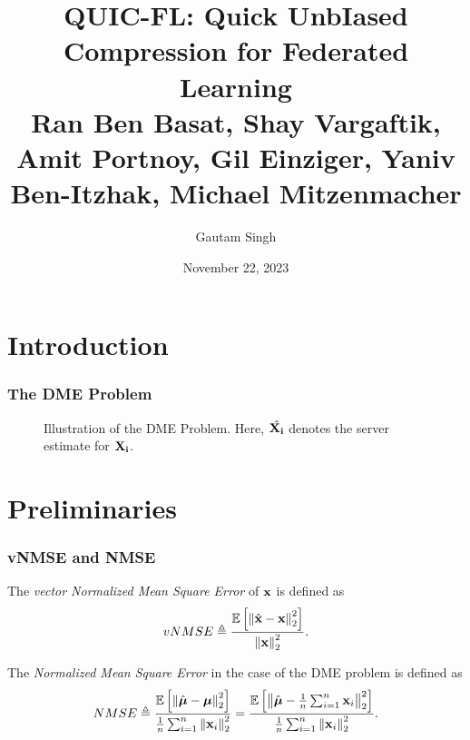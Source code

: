 \documentclass{beamer}
\title[QUIC-FL]{QUIC-FL: Quick UnbIased Compression for Federated Learning\\
\small Ran Ben Basat, Shay Vargaftik, Amit Portnoy, Gil Einziger, Yaniv Ben-Itzhak, Michael Mitzenmacher}
\date{November 22, 2023}
\author{Gautam Singh}
\institute[]{Indian Institute of Technology Hyderabad}
\begin{document}
    \maketitle
    \tableofcontents
    \section{Introduction}

    \begin{frame}
        \frametitle{The DME Problem}
        \begin{figure}[!ht]
            
            \caption{Illustration of the DME Problem. Here, \(\hat{\boldsymbol{\mathbf{X_i}}}\)
            denotes the server estimate for \(\boldsymbol{\mathbf{X_i}}\).} 
            \label{fig:dme}
        \end{figure}
    \end{frame}

    \section{Preliminaries}
    \begin{frame}
        \frametitle{vNMSE and NMSE}
        \begin{definition}[vNMSE]
        The \emph{vector Normalized Mean Square Error} of \(\boldsymbol{\mathbf{x}}\)
        is defined as
        \begin{equation}
            vNMSE \triangleq \frac{\mathbb{E}\left[ \left\lVert\hat{\boldsymbol{\mathbf{x}}}-\boldsymbol{\mathbf{x}}\right\rVert^2_2 \right]}{\left\lVert\boldsymbol{\mathbf{x}}\right\rVert^2_2}.
            \label{eq:vnmse-def}
        \end{equation}
        \end{definition}
        \begin{definition}[NMSE]
        The \emph{Normalized Mean Square Error} in the case of the DME
        problem is defined as
        \begin{equation}
            NMSE \triangleq \frac{\mathbb{E}\left[ \left\lVert\hat{\boldsymbol{\mathbf{\mu}}}-\boldsymbol{\mathbf{\mu}}\right\rVert^2_2 \right]}{\frac{1}{n}\sum_{i=1}^n\left\lVert\boldsymbol{\mathbf{x}}_i\right\rVert^2_2} = \frac{\mathbb{E}\left[ \left\lVert\hat{\boldsymbol{\mathbf{\mu}}}-\frac{1}{n}\sum_{i=1}^n\boldsymbol{\mathbf{x}}_i\right\rVert^2_2 \right]}{\frac{1}{n}\sum_{i=1}^n\left\lVert\boldsymbol{\mathbf{x}}_i\right\rVert^2_2}.
            \label{eq:nmse-def}
        \end{equation}
        \end{definition}
    \end{frame}
\end{document}
